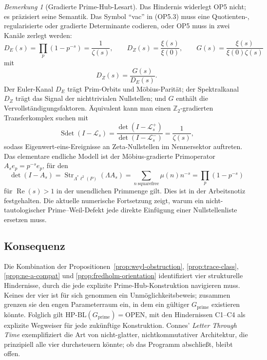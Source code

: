 \documentclass[11pt]{article}
\theoremstyle{definition}
\theoremstyle{remark}
\newtheorem{remark}[theorem]{Bemerkung}
\newcommand{\HBL}{\mathrm{HP\text{-}BL}}
\renewcommand{\Re}{\operatorname{Re}}
\begin{document}
\begin{remark}[Gradierte Prime-Hub-Lesart]\label{rem:graded-primehub}
Das Hindernis widerlegt OP5 nicht; es präzisiert seine Semantik. Das
Symbol ``vac'' in (OP5.3) muss eine Quotienten-, regularisierte oder
gradierte Determinante codieren, oder OP5 muss in zwei Kanäle zerlegt
werden:
\[
  D_E(s)=\prod_p(1-p^{-s})=\frac{1}{\zeta(s)},\qquad
  D_Z(s)=\frac{\xi(s)}{\xi(0)},\qquad
  G(s)=\frac{\xi(s)}{\xi(0)\zeta(s)}
\]
mit
\[
  D_Z(s)=\frac{G(s)}{D_E(s)}.
\]
Der Euler-Kanal $D_E$ trägt Prim-Orbits und Möbius-Parität; der
Spektralkanal $D_Z$ trägt das Signal der nichttrivialen Nullstellen;
und $G$ enthält die Vervollständigungsfaktoren. Äquivalent kann man
einen $\mathbb{Z}_2$-gradierten Transferkomplex suchen mit
\[
  \operatorname{Sdet}(I-\mathcal{L}_s)
  =\frac{\det(I-\mathcal{L}_s^+)}
          {\det(I-\mathcal{L}_s^-)}
  =\frac{1}{\zeta(s)},
\]
sodass Eigenwert-eins-Ereignisse an Zeta-Nullstellen im Nennersektor
auftreten. Das elementare endliche Modell ist der Möbius-gradierte
Primoperator $A_s e_p=p^{-s}e_p$, für den
\[
  \det(I-A_s)=\operatorname{Str}_{\Lambda^\ast\ell^2(P)}(\Lambda A_s)
  =\sum_{n\ \mathrm{squarefree}}\mu(n)n^{-s}
  =\prod_p(1-p^{-s})
\]
für $\Re(s)>1$ in der unendlichen Primmenge gilt. Dies ist in der
Arbeitsnotiz \cite{MobiusGradedPrimeHub} festgehalten. Die aktuelle
numerische Fortsetzung \cite{PrimeWeilBridgeDefect} zeigt, warum ein
nicht-tautologischer Prime--Weil-Defekt jede direkte Einfügung einer
Nullstellenliste ersetzen muss.
\end{remark}

\subsection{Konsequenz}

Die Kombination der Propositionen~\ref{prop:weyl-obstruction},
\ref{prop:trace-class}, \ref{prop:ne-a-compat} und
\ref{prop:fredholm-orientation} identifiziert vier
strukturelle Hindernisse, durch die jede explizite Prime-Hub-Konstruktion
navigieren muss. Keines der vier ist für sich genommen ein Unmöglichkeitsbeweis;
zusammen grenzen sie den engen Parameterraum ein, in dem
ein gültiger $G_\mathrm{prime}$ existieren könnte. Folglich
gilt $\HBL(G_\mathrm{prime}) = \mathrm{OPEN}$, mit den Hindernissen C1--C4
als explizite Wegweiser für jede zukünftige Konstruktion. Connes'
\emph{Letter Through Time} \cite{Connes2026} exemplifiziert die Art von
nicht-glatter, nichtkommutativer Architektur, die prinzipiell
alle vier durchsteuern könnte; ob das Programm abschließt, bleibt offen.
\end{document}
